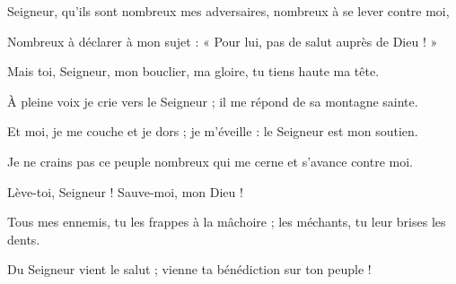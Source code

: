 \item Seigneur, qu'ils sont nombreux mes adversaires, nombreux à se lever contre moi,
\item Nombreux à déclarer à mon sujet : « Pour lui, pas de salut auprès de Dieu ! »
\item Mais toi, Seigneur, mon bouclier, ma gloire, tu tiens haute ma tête.
\item À pleine voix je crie vers le Seigneur ; il me répond de sa montagne sainte.
\item Et moi, je me couche et je dors ; je m'éveille : le Seigneur est mon soutien.
\item Je ne crains pas ce peuple nombreux qui me cerne et s'avance contre moi.
\item Lève-toi, Seigneur ! Sauve-moi, mon Dieu !
\item Tous mes ennemis, tu les frappes à la mâchoire ; les méchants, tu leur brises les dents.
\item Du Seigneur vient le salut ; vienne ta bénédiction sur ton peuple !
